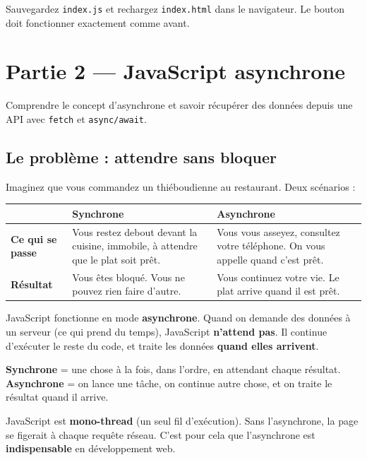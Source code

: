 \documentclass[11pt,a4paper]{article}
\begin{document}
Sauvegardez \texttt{index.js} et rechargez \texttt{index.html} dans le navigateur. Le bouton doit fonctionner exactement comme avant.

\section{Partie 2 --- JavaScript asynchrone}
\label{sec:async}

\begin{objectifbox}
Comprendre le concept d'asynchrone et savoir récupérer des données depuis une API avec \texttt{fetch} et \texttt{async/await}.
\end{objectifbox}

\subsection{Le problème : attendre sans bloquer}

Imaginez que vous commandez un thiéboudienne au restaurant. Deux scénarios :

\begin{center}
\begin{tabular}{lp{5cm}p{5cm}}
\toprule
& \textbf{Synchrone} & \textbf{Asynchrone} \\
\midrule
\textbf{Ce qui se passe} & Vous restez debout devant la cuisine, immobile, à attendre que le plat soit prêt. & Vous vous asseyez, consultez votre téléphone. On vous appelle quand c'est prêt. \\
\textbf{Résultat} & Vous êtes bloqué. Vous ne pouvez rien faire d'autre. & Vous continuez votre vie. Le plat arrive quand il est prêt. \\
\bottomrule
\end{tabular}
\end{center}

JavaScript fonctionne en mode \textbf{asynchrone}. Quand on demande des données à un serveur (ce qui prend du temps), JavaScript \textbf{n'attend pas}. Il continue d'exécuter le reste du code, et traite les données \textbf{quand elles arrivent}.

\begin{retenirbox}[À retenir]
\textbf{Synchrone} = une chose à la fois, dans l'ordre, en attendant chaque résultat.\\
\textbf{Asynchrone} = on lance une tâche, on continue autre chose, et on traite le résultat quand il arrive.

JavaScript est \textbf{mono-thread} (un seul fil d'exécution). Sans l'asynchrone, la page se figerait à chaque requête réseau. C'est pour cela que l'asynchrone est \textbf{indispensable} en développement web.
\end{retenirbox}
\end{document}
